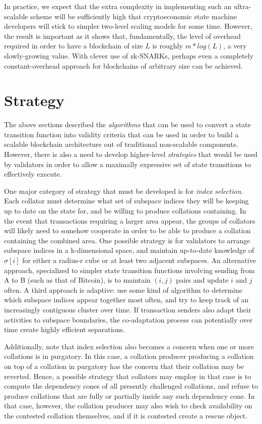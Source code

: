 \documentclass[11pt,a4paper]{article}
\theoremstyle{plain}
\theoremstyle{definition}
\theoremstyle{remark}
\begin{document}
In practice, we expect that the extra complexity in implementing such an ultra-scalable scheme will be sufficiently high that cryptoeconomic state machine developers will stick to simpler two-level scaling models for some time. However, the result is important as it shows that, fundamentally, the level of overhead required in order to have a blockchain of size $L$ is roughly $m * log(L)$, a very slowly-growing value. With clever use of zk-SNARKs, perhaps even a completely constant-overhead approach for blockchains of arbitrary size can be achieved.

\section{Strategy}

The above sections described the \emph{algorithms} that can be used to convert a state transition function into validity criteria that can be used in order to build a scalable blockchain architecture out of traditional non-scalable components. However, there is also a need to develop higher-level \emph{strategies} that would be used by validators in order to allow a maximally expressive set of state transitions to effectively execute.

One major category of strategy that must be developed is for \emph{index selection}. Each collator must determine what set of subspace indices they will be keeping up to date on the state for, and be willing to produce collations containing. In the event that transactions requiring a larger area appear, the groups of collators will likely need to somehow cooperate in order to be able to produce a collation containing the combined area. One possible strategy is for validators to arrange subspace indices in a k-dimensional space, and maintain up-to-date knowledge of $\sigma[i]$ for either a radius-r cube or at least two adjacent subspaces. An alternative approach, specialized to simpler state transition functions involving sending from A to B (such as that of Bitcoin), is to maintain $(i, j)$ pairs and update $i$ and $j$ often. A third approach is adaptive: use some kind of algorithm to determine which subspace indices appear together most often, and try to keep track of an increasingly contiguous cluster over time. If transaction senders also adapt their activities to subspace boundaries, the co-adaptation process can potentially over time create highly efficient separations.

Additionally, note that index selection also becomes a concern when one or more collations is in purgatory. In this case, a collation producer producing a collation on top of a collation in purgatory has the concern that their collation may be reverted. Hence, a possible strategy that collators may employ in that case is to compute the dependency cones of all presently challenged collations, and refuse to produce collations that are fully or partially inside any such dependency cone. In that case, however, the collation producer may also wish to check availability on the contested collation themselves, and if it is contested create a rescue object.
\end{document}
